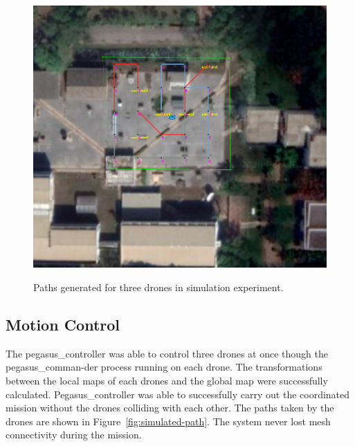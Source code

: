 \begin{figure}
	\centering
	\caption[Paths generated for three drones in simulation experiment.]{\small Paths generated for three drones in simulation experiment.} 
	\includegraphics[width=5in]{figures/experiment/simulated-plan}
	\label{fig:simulated-plan}
\end{figure}

\subsection{Motion Control}
The pegasus\_controller was able to control three drones at once though the pegasus\_comman-der process running on each drone. The transformations between the local maps of each drones and the global map were successfully calculated. Pegasus\_controller was able to successfully carry out the coordinated mission without the drones colliding with each other.  The paths taken by the drones are shown in Figure~\ref{fig:simulated-path}. The system never lost mesh connectivity during the mission.

